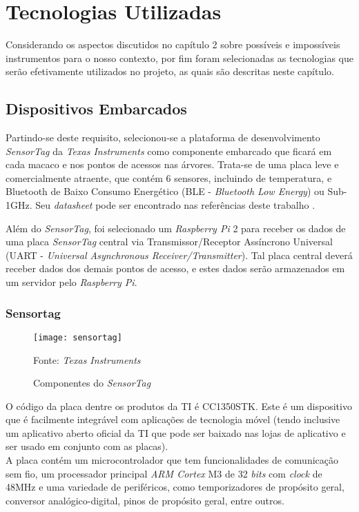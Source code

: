 \chapter{Tecnologias Utilizadas}
Considerando os aspectos discutidos no capítulo 2 sobre possíveis e impossíveis instrumentos para o nosso contexto, por fim foram selecionadas as tecnologias que serão efetivamente utilizados no projeto, as quais são descritas neste capítulo.

\section{Dispositivos Embarcados}

Partindo-se deste requisito, selecionou-se a plataforma de desenvolvimento \emph{SensorTag} da \emph{Texas Instruments} como componente embarcado que ficará em cada macaco e nos pontos de acessos nas árvores. Trata-se de uma placa leve e comercialmente atraente, que contém 6 sensores, incluindo de temperatura, e Bluetooth de Baixo Consumo Energético (BLE - \emph{Bluetooth Low Energy}) ou Sub-1GHz. Seu \emph{datasheet} pode ser encontrado nas referências deste trabalho \cite{datasheet}.

Além do \emph{SensorTag}, foi selecionado um \emph{Raspberry Pi} 2 para receber os dados de uma placa \emph{SensorTag} central via Transmissor/Receptor Assíncrono Universal (UART - \emph{Universal Asynchronous Receiver/Transmitter}). Tal placa central deverá receber dados dos demais pontos de acesso, e estes dados serão armazenados em um servidor pelo \emph{Raspberry Pi}.

\subsection{Sensortag}

\begin{figure}[ht]
  \centering
  \caption{Componentes do \emph{SensorTag}}
    \texttt{[image: sensortag]}
  \centerline{\small{Fonte: \emph{Texas Instruments}}}
\end{figure}

O código da placa dentre os produtos da TI é CC1350STK. Este é um dispositivo que é facilmente integrável com aplicações de tecnologia móvel (tendo inclusive um aplicativo aberto oficial da TI que pode ser baixado nas lojas de aplicativo e ser usado em conjunto com as placas).\\

A placa contém um microcontrolador que tem funcionalidades de comunicação sem fio, um processador principal \emph{ARM Cortex} M3 de 32 \emph{bits} com \emph{clock} de 48MHz e uma variedade de periféricos, como temporizadores de propósito geral, conversor analógico-digital, pinos de propósito geral, entre outros.

